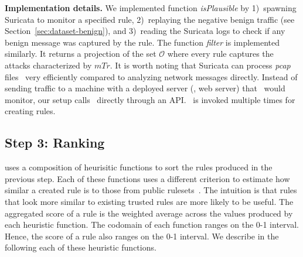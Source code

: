 \documentclass[sigconf,review, anonymous]{acmart}
\begin{document}
\textbf{Implementation details.} We implemented function
\emph{isPlausible} by 1)~spawning Suricata to monitor a specified
rule, 2)~replaying the negative benign traffic (see
Section~\ref{sec:dataset-benign}), and 3)~reading the Suricata logs to
check if any benign message was captured by the rule. The function
\emph{filter} is implemented similarly. It returns a projection of the
set $\mathcal O$ where every rule captures the attacks characterized
by $\mathit{mTr}$. It is worth noting that Suricata can process
\emph{pcap} files~\cite{pcap} very efficiently compared to analyzing
network messages directly. Instead of sending traffic to a machine
with a deployed server (\eg{}, web server) that \suri\ would monitor,
our setup calls \suri\ directly through an API. \suri\ is invoked
multiple times for creating rules.


\subsection{Step 3: Ranking}
\label{sec:ranking}

\tname{} uses a composition of heurisitic functions to sort the rules
produced in the previous step. Each of these functions uses a
different criterion to estimate how similar a created rule is to those
from public rulesets~\cite{emerging-threats-open}. The intuition is
that rules that look more similar to existing trusted rules are more
likely to be useful. The aggregated score of a rule is the weighted
average across the values produced by each heuristic function. The
codomain of each function ranges on the 0-1 interval. Hence, the score
of a rule also ranges on the 0-1 interval. We describe in the
following each of these heuristic functions.

\end{document}
